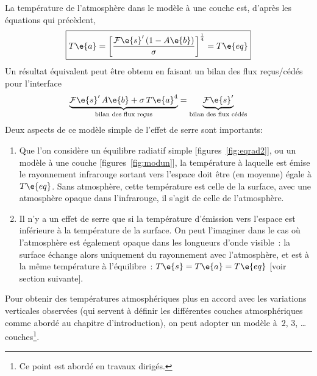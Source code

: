 \sk
La température de l'atmosphère dans le modèle à une couche est, d'après les équations qui précèdent,
\[ \boxed{ T\e{a} = \bigg[ \frac{ \mathcal{F}\e{s}'\,(1-A\e{b}) }{ \sigma } \bigg]^{\frac{1}{4}} = T\e{eq} } \]
Un résultat équivalent peut être obtenu en faisant un bilan des flux reçus/cédés pour l'interface 
\[ \underbrace{\mathcal{F}\e{s}'\,A\e{b} + \sigma \, {T\e{a}}^4}_{\text{bilan des flux reçus}} = \underbrace{\mathcal{F}\e{s}'}_{\text{bilan des flux cédés}} \] 
Deux aspects de ce modèle simple de l'effet de serre sont importants:
\begin{enumerate}
\item Que l'on considère un équilibre radiatif simple [figures~\ref{fig:eqrad2}], ou un modèle à une couche [figures~\ref{fig:modun}], la température à laquelle est émise le rayonnement infrarouge sortant vers l'espace doit être (en moyenne) égale à $T\e{eq}$. Sans atmosphère, cette température est celle de la surface, avec une atmosphère opaque dans l'infrarouge, il s'agit de celle de l'atmosphère.
\item Il n'y a un effet de serre que si la température d'émission vers l'espace est inférieure à la température de la surface. On peut l'imaginer dans le cas où l'atmosphère est également opaque dans les longueurs d'onde visible~: la surface échange alors uniquement du rayonnement avec l'atmosphère, et est à la même température à l'équilibre~: $T\e{s}=T\e{a}=T\e{eq}$ [voir section suivante].
\end{enumerate}
Pour obtenir des températures atmosphériques plus en accord avec les variations verticales observées (qui servent à définir les différentes couches atmosphériques comme abordé au chapitre d'introduction), on peut adopter un modèle à~$2$, $3$, \ldots couches\footnote{Ce point est abordé en travaux dirigés.}.
